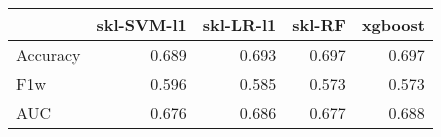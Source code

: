 \begin{tabular}{lrrrr}
\toprule
{} &  skl-SVM-l1 &  skl-LR-l1 &  skl-RF &  xgboost \\
\midrule
Accuracy &       0.689 &      0.693 &   0.697 &    0.697 \\
F1w      &       0.596 &      0.585 &   0.573 &    0.573 \\
AUC      &       0.676 &      0.686 &   0.677 &    0.688 \\
\bottomrule
\end{tabular}
